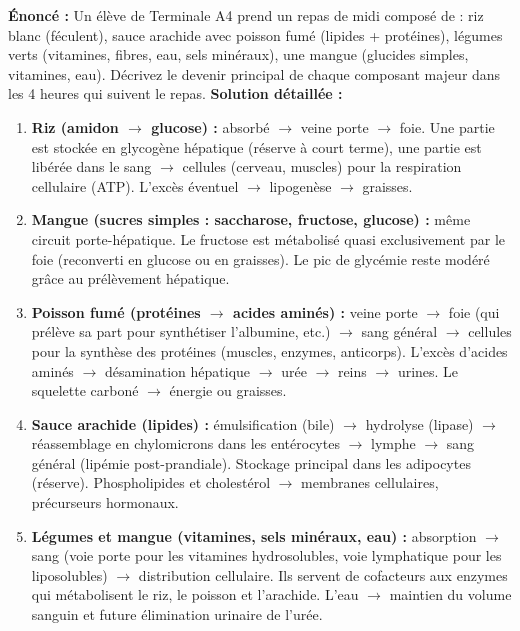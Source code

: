 \documentclass[11pt]{article}
\begin{document}
\begin{exoresolu}
\textbf{Énoncé :} Un élève de Terminale A4 prend un repas de midi composé de : riz blanc (féculent), sauce arachide avec poisson fumé (lipides + protéines), légumes verts (vitamines, fibres, eau, sels minéraux), une mangue (glucides simples, vitamines, eau). Décrivez le devenir principal de chaque composant majeur dans les 4 heures qui suivent le repas.
\tcblower
\textbf{Solution détaillée :}
\begin{enumerate}
    \item \textbf{Riz (amidon $\rightarrow$ glucose) :} absorbé $\rightarrow$ veine porte $\rightarrow$ foie. Une partie est stockée en glycogène hépatique (réserve à court terme), une partie est libérée dans le sang $\rightarrow$ cellules (cerveau, muscles) pour la respiration cellulaire (ATP). L'excès éventuel $\rightarrow$ lipogenèse $\rightarrow$ graisses.
    \item \textbf{Mangue (sucres simples : saccharose, fructose, glucose) :} même circuit porte-hépatique. Le fructose est métabolisé quasi exclusivement par le foie (reconverti en glucose ou en graisses). Le pic de glycémie reste modéré grâce au prélèvement hépatique.
    \item \textbf{Poisson fumé (protéines $\rightarrow$ acides aminés) :} veine porte $\rightarrow$ foie (qui prélève sa part pour synthétiser l'albumine, etc.) $\rightarrow$ sang général $\rightarrow$ cellules pour la synthèse des protéines (muscles, enzymes, anticorps). L'excès d'acides aminés $\rightarrow$ désamination hépatique $\rightarrow$ urée $\rightarrow$ reins $\rightarrow$ urines. Le squelette carboné $\rightarrow$ énergie ou graisses.
    \item \textbf{Sauce arachide (lipides) :} émulsification (bile) $\rightarrow$ hydrolyse (lipase) $\rightarrow$ réassemblage en chylomicrons dans les entérocytes $\rightarrow$ lymphe $\rightarrow$ sang général (lipémie post-prandiale). Stockage principal dans les adipocytes (réserve). Phospholipides et cholestérol $\rightarrow$ membranes cellulaires, précurseurs hormonaux.
    \item \textbf{Légumes et mangue (vitamines, sels minéraux, eau) :} absorption $\rightarrow$ sang (voie porte pour les vitamines hydrosolubles, voie lymphatique pour les liposolubles) $\rightarrow$ distribution cellulaire. Ils servent de cofacteurs aux enzymes qui métabolisent le riz, le poisson et l'arachide. L'eau $\rightarrow$ maintien du volume sanguin et future élimination urinaire de l'urée.
\end{enumerate}
\end{exoresolu}
\end{document}
